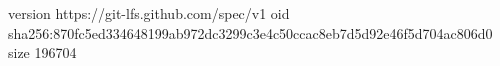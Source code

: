 version https://git-lfs.github.com/spec/v1
oid sha256:870fc5ed334648199ab972dc3299c3e4c50ccac8eb7d5d92e46f5d704ac806d0
size 196704

